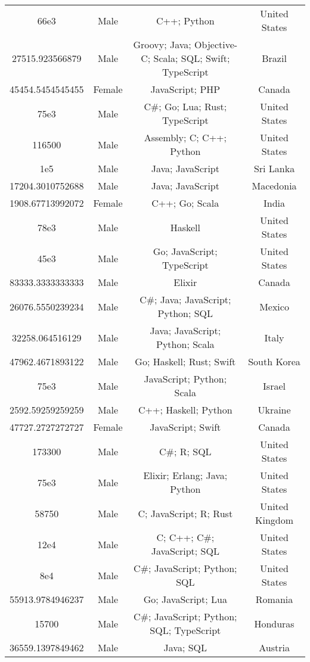 \begin{center}
\begin{tabular}{ |c|c|c|c| }
66e3  &  Male  &  C++; Python  &  United States  \\ 
27515.923566879  &  Male  &  Groovy; Java; Objective-C; Scala; SQL; Swift; TypeScript  &  Brazil  \\ 
45454.5454545455  &  Female  &  JavaScript; PHP  &  Canada  \\ 
75e3  &  Male  &  C\#; Go; Lua; Rust; TypeScript  &  United States  \\ 
116500  &  Male  &  Assembly; C; C++; Python  &  United States  \\ 
1e5  &  Male  &  Java; JavaScript  &  Sri Lanka  \\ 
17204.3010752688  &  Male  &  Java; JavaScript  &  Macedonia  \\ 
1908.67713992072  &  Female  &  C++; Go; Scala  &  India  \\ 
78e3  &  Male  &  Haskell  &  United States  \\ 
45e3  &  Male  &  Go; JavaScript; TypeScript  &  United States  \\ 
83333.3333333333  &  Male  &  Elixir  &  Canada  \\ 
26076.5550239234  &  Male  &  C\#; Java; JavaScript; Python; SQL  &  Mexico  \\ 
32258.064516129  &  Male  &  Java; JavaScript; Python; Scala  &  Italy  \\ 
47962.4671893122  &  Male  &  Go; Haskell; Rust; Swift  &  South Korea  \\ 
75e3  &  Male  &  JavaScript; Python; Scala  &  Israel  \\ 
2592.59259259259  &  Male  &  C++; Haskell; Python  &  Ukraine  \\ 
47727.2727272727  &  Female  &  JavaScript; Swift  &  Canada  \\ 
173300  &  Male  &  C\#; R; SQL  &  United States  \\ 
75e3  &  Male  &  Elixir; Erlang; Java; Python  &  United States  \\ 
58750  &  Male  &  C; JavaScript; R; Rust  &  United Kingdom  \\ 
12e4  &  Male  &  C; C++; C\#; JavaScript; SQL  &  United States  \\ 
8e4  &  Male  &  C\#; JavaScript; Python; SQL  &  United States  \\ 
55913.9784946237  &  Male  &  Go; JavaScript; Lua  &  Romania  \\ 
15700  &  Male  &  C\#; JavaScript; Python; SQL; TypeScript  &  Honduras  \\ 
36559.1397849462  &  Male  &  Java; SQL  &  Austria  \\ 

\end{tabular}
\end{center}
